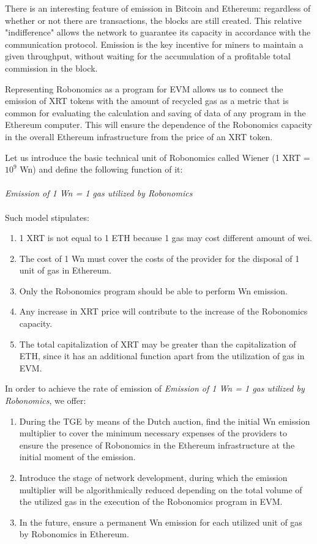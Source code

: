 \documentclass{article}
\begin{document}
There is an interesting feature of emission in Bitcoin and Ethereum: regardless of whether or not there are transactions, the blocks are still created. This relative "indifference" allows the network to guarantee its capacity in accordance with the communication protocol. Emission is the key incentive for miners to maintain a given throughput, without waiting for the accumulation of a profitable total commission in the block.
 
Representing Robonomics as a program for EVM allows us to connect the emission of XRT tokens with the amount of recycled gas as a metric that is common for evaluating the calculation and saving of data of any program in the Ethereum computer. This will ensure the dependence of the Robonomics capacity in the overall Ethereum infrastructure from the price of an XRT token.
 
Let us introduce the basic technical unit of Robonomics called Wiener (1 XRT = $10^9$ Wn) and define the following function of it:
\\
\\
\textit{Emission of 1 Wn = 1 gas utilized by Robonomics}
\\
\\
Such model stipulates:
\begin{enumerate}
	\item 1 XRT is not equal to 1 ETH because 1 gas may cost different amount of wei.
	\item The cost of 1 Wn must cover the costs of the provider for the disposal of 1 unit of gas in Ethereum.
	\item Only the Robonomics program should be able to perform Wn emission.
	\item Any increase in XRT price will contribute to the increase of the Robonomics capacity.
	\item The total capitalization of XRT may be greater than the capitalization of ETH, since it has an additional function apart from the utilization of gas in EVM.
\end{enumerate}

In order to achieve the rate of emission of \textit{Emission of 1 Wn = 1 gas utilized by Robonomics}, we offer:
\begin{enumerate}
	\item During the TGE by means of the Dutch auction, find the initial Wn emission multiplier to cover the minimum necessary expenses of the providers to ensure the presence of Robonomics in the Ethereum infrastructure at the initial moment of the emission.
	\item Introduce the stage of network development, during which the emission multiplier will be algorithmically reduced depending on the total volume of the utilized gas in the execution of the Robonomics program in EVM.
	\item In the future, ensure a permanent Wn emission for each utilized unit of gas by Robonomics in Ethereum.
\end{enumerate}
\end{document}
